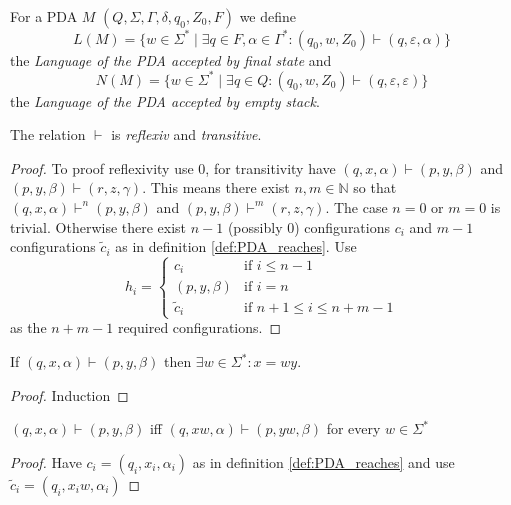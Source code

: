 \begin{definition}
  \label{def:PDA_language}

  For a PDA $M$ $(Q,\Sigma,\Gamma,\delta,q_0,Z_0,F)$ we define $$L(M)=\{w\in\Sigma^*\mid
  \exists q\in F,\alpha\in\Gamma^*: (q_0,w,Z_0)\vdash(q,\varepsilon,\alpha)\}$$ the
  \emph {Language of the PDA accepted by final state} and $$N(M)=\{w\in\Sigma^*\mid
  \exists q\in Q: (q_0,w,Z_0)\vdash(q,\varepsilon,\varepsilon)\}$$ the
  \emph {Language of the PDA accepted by empty stack}.

\end{definition}
\begin{theorem}\label{thm:PDA_reaches}
  The relation $\vdash$ is \emph{reflexiv} and \emph{transitive}.
\end{theorem}
\begin{proof}
  To proof reflexivity use $0$,
  for transitivity have  $(q,x,\alpha)\vdash(p,y,\beta)$ and
  $(p,y,\beta)\vdash(r,z,\gamma)$. This means there exist $n,m\in\mathbb{N}$ so that
  $(q,x,\alpha)\vdash^n(p,y,\beta)$ and $(p,y,\beta)\vdash^m(r,z,\gamma)$.
  The case $n=0$ or $m=0$ is trivial. Otherwise there exist $n-1$ (possibly $0$) configurations
  $c_i$ and $m-1$ configurations $\tilde{c}_i$ as in definition \ref{def:PDA_reaches}.
  Use
  $$
  h_i =
  \begin{cases}
    c_i          & \text{if } i\le n-1 \\
    (p,y,\beta) & \text{if } i = n \\
    \tilde{c}_i  & \text{if } n+1\le i \le n+m-1
  \end{cases}
  $$
  as the $n+m-1$ required configurations.
\end{proof}
\begin{theorem}\label{thm:PDA_reaches_input_decreasing}
  If $(q,x,\alpha)\vdash(p,y,\beta)$ then $\exists w\in\Sigma^*: x=wy$.
\end{theorem}
\begin{proof}
  Induction
\end{proof}
\begin{theorem}\label{thm:PDA_reaches_unconsumed_input}
  $(q,x,\alpha)\vdash(p,y,\beta)$ iff $(q,xw,\alpha)\vdash(p,yw,\beta)$ for
  every $w\in\Sigma^*$
\end{theorem}
\begin{proof}
  Have $c_i = (q_i,x_i,\alpha_i)$ as in definition \ref{def:PDA_reaches} and use
  $\tilde{c}_i = (q_i,x_iw,\alpha_i)$
\end{proof}

